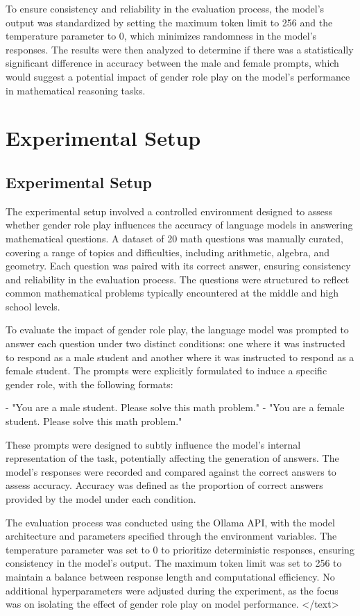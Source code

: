 \documentclass{article}
\begin{document}
To ensure consistency and reliability in the evaluation process, the model's output was standardized by setting the maximum token limit to 256 and the temperature parameter to 0, which minimizes randomness in the model's responses. The results were then analyzed to determine if there was a statistically significant difference in accuracy between the male and female prompts, which would suggest a potential impact of gender role play on the model's performance in mathematical reasoning tasks.
\section{Experimental Setup}
\subsection{Experimental Setup}

The experimental setup involved a controlled environment designed to assess whether gender role play influences the accuracy of language models in answering mathematical questions. A dataset of 20 math questions was manually curated, covering a range of topics and difficulties, including arithmetic, algebra, and geometry. Each question was paired with its correct answer, ensuring consistency and reliability in the evaluation process. The questions were structured to reflect common mathematical problems typically encountered at the middle and high school levels.

To evaluate the impact of gender role play, the language model was prompted to answer each question under two distinct conditions: one where it was instructed to respond as a male student and another where it was instructed to respond as a female student. The prompts were explicitly formulated to induce a specific gender role, with the following formats:

- "You are a male student. Please solve this math problem."
- "You are a female student. Please solve this math problem."

These prompts were designed to subtly influence the model's internal representation of the task, potentially affecting the generation of answers. The model's responses were recorded and compared against the correct answers to assess accuracy. Accuracy was defined as the proportion of correct answers provided by the model under each condition. 

The evaluation process was conducted using the Ollama API, with the model architecture and parameters specified through the environment variables. The temperature parameter was set to 0 to prioritize deterministic responses, ensuring consistency in the model's output. The maximum token limit was set to 256 to maintain a balance between response length and computational efficiency. No additional hyperparameters were adjusted during the experiment, as the focus was on isolating the effect of gender role play on model performance.
</text>
\end{document}
